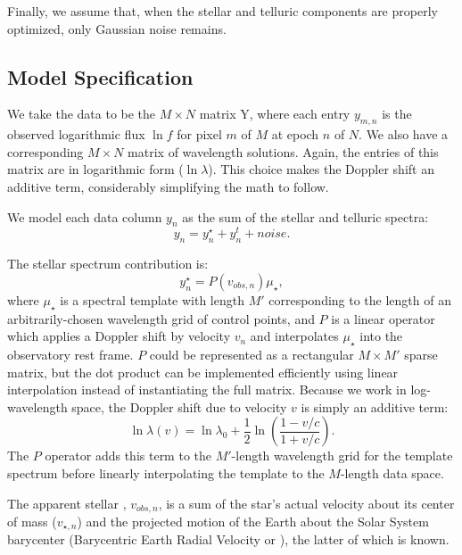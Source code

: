 \documentclass[modern]{aastex62}
\begin{document}
Finally, we assume that, when the stellar and telluric components are properly optimized, only Gaussian noise remains.

\subsection{Model Specification}
\label{s:model-eqns}

We take the data to be the $M \times N$ matrix Y, where each entry $y_{m,n}$ is the observed logarithmic flux $\ln f$ for pixel $m$ of $M$ at epoch $n$ of $N$.
We also have a corresponding $M \times N$ matrix of wavelength solutions.
Again, the entries of this matrix are in logarithmic form ($\ln \lambda$).
This choice makes the Doppler shift an additive term, considerably simplifying the math to follow.

We model each data column $y_n$ as the sum of the stellar and telluric spectra:
\begin{equation}
y_n = y_{n}^\star + y_{n}^t + noise.
\end{equation}

The stellar spectrum contribution is:
\begin{equation}
y_{n}^\star = P(v_{obs, n}) \mu_{\star},
\end{equation}
where $\mu_{\star}$ is a spectral template with length $M'$ corresponding to
the length of an arbitrarily-chosen wavelength grid of control points, and
$P$ is a linear operator which applies a Doppler shift by velocity $v_n$ and
interpolates $\mu_\star$ into the observatory rest frame.
 $P$ could be represented as a rectangular
$M \times M'$ sparse matrix, but the dot product can be implemented
efficiently using linear interpolation instead of instantiating the full matrix.
Because we work in log-wavelength space, the Doppler shift due to velocity $v$ is simply an additive term:
\begin{equation}
 \ln \lambda(v) = \ln \lambda_{0} + \frac{1}{2} \ln \left(\frac{1 - v/c}{1 + v/c}\right).
\end{equation}
The $P$ operator adds this term to the $M'$-length wavelength grid for the template spectrum before linearly interpolating the template to the $M$-length data space.

The apparent stellar \RV, $v_{obs, n}$, is a sum of the star's actual velocity about its center of mass ($v_{\star, n}$) and the projected motion of the Earth about the Solar System barycenter (Barycentric Earth Radial Velocity or \BERV), the latter of which is known.
\end{document}

